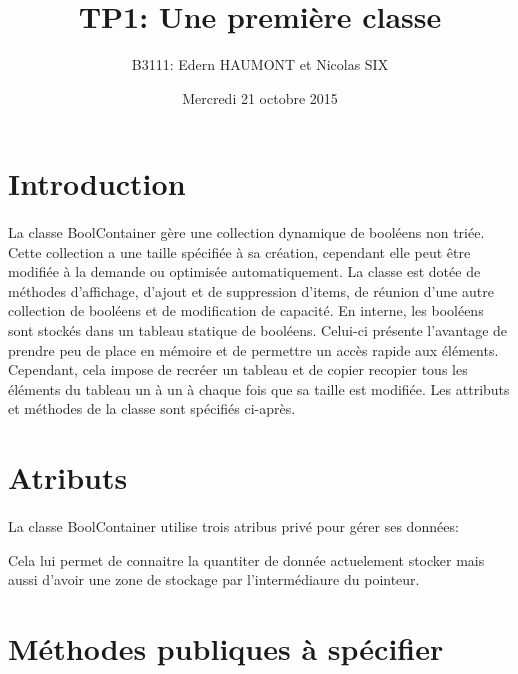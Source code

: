 \documentclass[a4paper, 12pts]{article}
\title{TP1: Une première classe}
\author{B3111: Edern HAUMONT et Nicolas SIX}
\date{Mercredi 21 octobre 2015}
\begin{document}

\maketitle






\section{Introduction}
\paragraph{}
La classe BoolContainer gère une collection dynamique de booléens non triée. Cette collection a une taille spécifiée à sa création, cependant elle peut être modifiée à la demande ou optimisée automatiquement.
La classe est dotée de méthodes d’affichage, d’ajout et de suppression d’items, de réunion d’une autre collection de booléens et de modification de capacité.
En interne, les booléens sont stockés dans un tableau statique de booléens. Celui-ci présente l'avantage de prendre peu de place en mémoire et de permettre un accès rapide aux éléments. Cependant, cela impose de recréer un tableau et de copier recopier tous les éléments du tableau un à un à chaque fois que sa taille est modifiée.
Les attributs et méthodes de la classe sont spécifiés ci-après.

\section{Atributs}
\paragraph{}
La classe BoolContainer utilise trois atribus privé pour gérer ses données:

Cela lui permet de connaitre la quantiter de donnée actuelement stocker mais aussi d'avoir une zone de stockage par l'intermédiaure du pointeur.

\section{Méthodes publiques à spécifier}
\end{document}
